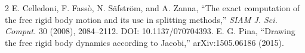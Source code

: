 \documentclass[8pt]{extarticle}
\begin{document}
\begin{thebibliography}{2}
 E. Celledoni, F. Fassò, N. Säfström, and A. Zanna,
``The exact computation of the free rigid body motion and its use in
splitting methods,'' \emph{SIAM J. Sci. Comput.} 30 (2008), 2084--2112.
DOI: 10.1137/070704393.
 E. G. Pina,
``Drawing the free rigid body dynamics according to Jacobi,''
arXiv:1505.06186 (2015).
\end{thebibliography}
\end{document}
